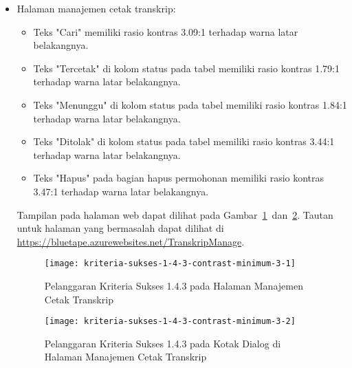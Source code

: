 \begin{itemize}
    \item Halaman manajemen cetak transkrip: 
    \begin{itemize}
        \item Teks "Cari" memiliki rasio kontras 3.09:1 terhadap warna latar belakangnya.
        \item Teks "Tercetak" di kolom status pada tabel memiliki rasio kontras 1.79:1 terhadap warna latar belakangnya.
        \item Teks "Menunggu" di kolom status pada tabel memiliki rasio kontras 1.84:1 terhadap warna latar belakangnya.
        \item Teks "Ditolak" di kolom status pada tabel memiliki rasio kontras 3.44:1 terhadap warna latar belakangnya.
        \item Teks "Hapus" pada bagian hapus permohonan memiliki rasio kontras 3.47:1 terhadap warna latar belakangnya.
    \end{itemize}
    Tampilan pada halaman web dapat dilihat pada \mbox{Gambar \ref{fig:1.4.3_contrast_minimum_3_1} dan \ref{fig:1.4.3_contrast_minimum_3_2}}. Tautan untuk halaman yang bermasalah dapat dilihat di \url{https://bluetape.azurewebsites.net/TranskripManage}.
    \begin{figure}[H]
        \centering  
        \texttt{[image: kriteria-sukses-1-4-3-contrast-minimum-3-1]}  
        \caption[Pelanggaran Kriteria Sukses 1.4.3 pada Halaman Manajemen Cetak Transkrip]{Pelanggaran Kriteria Sukses 1.4.3 pada Halaman Manajemen Cetak Transkrip}
        \label{fig:1.4.3_contrast_minimum_3_1}
    \end{figure} 
    
    \begin{figure}[H]
        \centering  
        \texttt{[image: kriteria-sukses-1-4-3-contrast-minimum-3-2]}  
        \caption[Pelanggaran Kriteria Sukses 1.4.3 pada Kotak Dialog di Halaman Manajemen Cetak Transkrip]{Pelanggaran Kriteria Sukses 1.4.3 pada Kotak Dialog di Halaman Manajemen Cetak Transkrip}
        \label{fig:1.4.3_contrast_minimum_3_2}
    \end{figure} 


\end{itemize}
